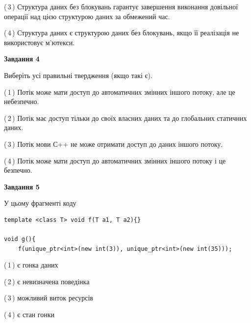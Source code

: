 \documentclass[12pt, ukrainian]{article}
\begin{document}
\begin {large}
{(\,3\,) Структура даних без блокувань гарантує завершення виконання довільної операції над цією структурою даних за обмежений час.%

(\,4\,) Структура даних є структурою даних без блокувань, якщо її реалізація не використовує м’ютекси.%



\begin{center}
\textbf{Завдання 4}
\end{center}
Виберіть усі правильні твердження (якщо такі є).\par
\vspace{2mm}

(\,1\,) Потік може мати доступ до автоматичних змінних іншого потоку, але це небезпечно.%

(\,2\,) Потік має доступ тільки до своїх власних даних та до глобальних статичних даних.%

(\,3\,) Потік мови С++ не може отримати доступ до даних іншого потоку.%

(\,4\,) Потік може мати доступ до автоматичних змінних іншого потоку і це безпечно.%



\begin{center}
\textbf{Завдання 5}
\end{center}
У цьому фрагменті коду
\begin{verbatim}
template <class T> void f(T a1, T a2){}

void g(){
    f(unique_ptr<int>(new int(3)), unique_ptr<int>(new int(35)));
\end{verbatim}

(\,1\,) є гонка даних%

(\,2\,) є невизначена поведінка%

(\,3\,) можливий виток ресурсів%

(\,4\,) є стан гонки%


}
\end {large}
\end{document}
